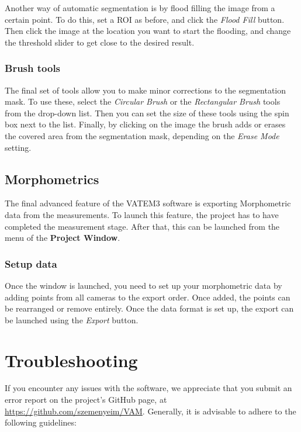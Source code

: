 \documentclass[10pt,a4paper,oneside]{report}             %
\begin{document}
Another way of automatic segmentation is by flood filling the image from a certain point. To do this, set a ROI as before, and click the \textit{Flood Fill} button. Then click the image at the location you want to start the flooding, and change the threshold slider to get close to the desired result.

\subsection{Brush tools}

The final set of tools allow you to make minor corrections to the segmentation mask. To use these, select the \textit{Circular Brush} or the \textit{Rectangular Brush} tools from the drop-down list. Then you can set the size of these tools using the spin box next to the list. Finally, by clicking on the image the brush adds or erases the covered area from the segmentation mask, depending on the \textit{Erase Mode} setting.

\section{Morphometrics}

The final advanced feature of the VATEM3 software is exporting Morphometric data from the measurements. To launch this feature, the project has to have completed the measurement stage. After that, this can be launched from the  menu of the \textbf{Project Window}. 

\subsection{Setup data}

Once the window is launched, you need to set up your morphometric data by adding points from all cameras to the export order. Once added, the points can be rearranged or remove entirely. Once the data format is set up, the export can be launched using the \textit{Export} button.

\chapter{Troubleshooting}

If you encounter any issues with the software, we appreciate that you submit an error report on the project's GitHub page, at \url{https://github.com/szemenyeim/VAM}. Generally, it is advisable to adhere to the following guidelines:
\end{document}
